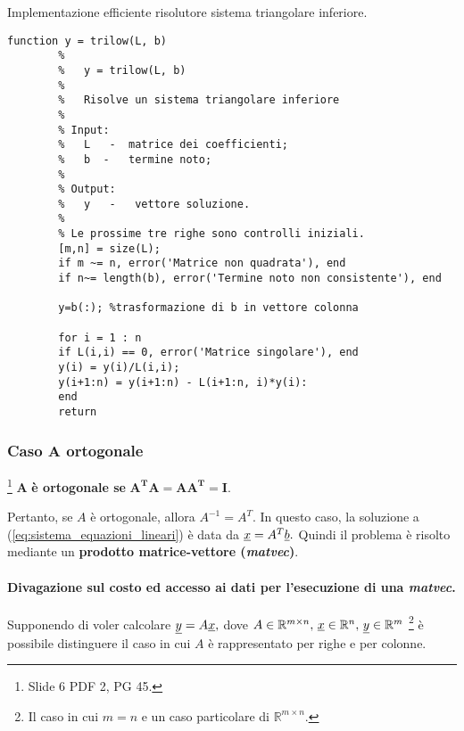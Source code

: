\begin{algorithm}
	\caption{Implementazione efficiente risolutore sistema triangolare inferiore.}\label{alg:trilow}
	\begin{lstlisting}[style=Matlab-editor]
		function y = trilow(L, b)
		%   
		%   y = trilow(L, b)
		%
		%   Risolve un sistema triangolare inferiore
		%
		% Input:
		%   L   -  matrice dei coefficienti;
		%   b  -   termine noto;
		%   
		% Output:
		%   y   -   vettore soluzione.
		%
		% Le prossime tre righe sono controlli iniziali.
		[m,n] = size(L);
		if m ~= n, error('Matrice non quadrata'), end
		if n~= length(b), error('Termine noto non consistente'), end
		
		y=b(:); %trasformazione di b in vettore colonna
		
		for i = 1 : n
		if L(i,i) == 0, error('Matrice singolare'), end
		y(i) = y(i)/L(i,i);
		y(i+1:n) = y(i+1:n) - L(i+1:n, i)*y(i):
		end
		return
	\end{lstlisting}
\end{algorithm}

\subsubsection{Caso \texorpdfstring{$\boldsymbol A$}{A} ortogonale}
\begin{definition}
    \footnote{Slide 6 PDF 2, PG 45.} $\boldsymbol A$ \textbf{è ortogonale se} $\boldsymbol{A^TA=AA^T=I.}$
\end{definition}
Pertanto, se $A$ è ortogonale, allora $A^{-1}=A^T.$ In questo caso, la soluzione a (\ref{eq:sistema_equazioni_lineari}) è data da $\uline x = A^T\uline b.$ Quindi il problema è risolto mediante un \textbf{prodotto matrice-vettore (\textit{matvec})}.

\paragraph{Divagazione sul costo ed accesso ai dati per l'esecuzione di una \textit{matvec}.} Supponendo di voler calcolare $\uline y= A \uline x,$ dove $A\in\mathbb R^{m\times n},\,\uline x\in\mathbb R^n,\, \uline y\in\mathbb R^m$ \footnote{Il caso in cui $m=n$ e un caso particolare di $\mathbb R^{m\times n}$.} è possibile distinguere il caso in cui $A$ è rappresentato per righe e per colonne.

